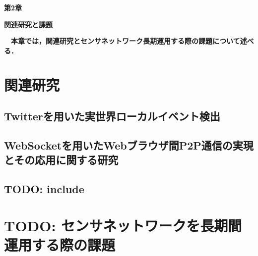 \newpage
\setcounter{chapter}{2}
\setcounter{section}{0}

\begin{center}
\vspace{0.5cm}
\huge{\bf 第2章}
\par
\vspace{1cm}
\hrulefill
\par
\vspace{1cm}
\huge{\bf 関連研究と課題}
\par
\vspace{0.5cm}
\hrulefill
\vspace{1cm}
\par

\begin{flushleft}
\large{{\bf　本章では，関連研究とセンサネットワーク長期運用する際の課題について述べる．}}
\end{flushleft}
\end{center}


\newpage

\section{関連研究}

\newpage

\subsection{Twitterを用いた実世界ローカルイベント検出}

\newpage

\subsection{WebSocketを用いたWebブラウザ間P2P通信の実現とその応用に関する研究}

\newpage

\subsection{TODO: include}

\newpage

\section{TODO: センサネットワークを長期間運用する際の課題}

